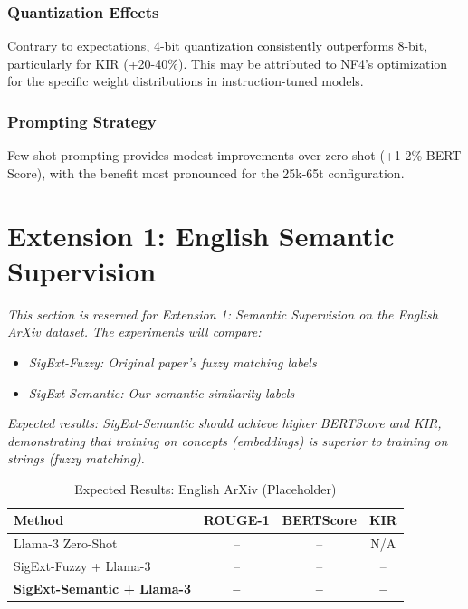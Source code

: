 \documentclass[conference]{IEEEtran}
\begin{document}
\subsubsection{Quantization Effects}
Contrary to expectations, 4-bit quantization consistently outperforms 8-bit, particularly for KIR (+20-40\%). This may be attributed to NF4's optimization for the specific weight distributions in instruction-tuned models.

\subsubsection{Prompting Strategy}
Few-shot prompting provides modest improvements over zero-shot (+1-2\% BERT Score), with the benefit most pronounced for the 25k-65t configuration.

\section{Extension 1: English Semantic Supervision}

\textit{This section is reserved for Extension 1: Semantic Supervision on the English ArXiv dataset. The experiments will compare:}

\begin{itemize}
    \item \textit{SigExt-Fuzzy: Original paper's fuzzy matching labels}
    \item \textit{SigExt-Semantic: Our semantic similarity labels}
\end{itemize}

\textit{Expected results: SigExt-Semantic should achieve higher BERTScore and KIR, demonstrating that training on concepts (embeddings) is superior to training on strings (fuzzy matching).}

\begin{table}[htbp]
\caption{Expected Results: English ArXiv (Placeholder)}
\begin{center}
\begin{tabular}{lccc}
\toprule
\textbf{Method} & \textbf{ROUGE-1} & \textbf{BERTScore} & \textbf{KIR} \\
\midrule
Llama-3 Zero-Shot & -- & -- & N/A \\
SigExt-Fuzzy + Llama-3 & -- & -- & -- \\
\textbf{SigExt-Semantic + Llama-3} & \textbf{--} & \textbf{--} & \textbf{--} \\
\bottomrule
\end{tabular}
\label{tab:arxiv_placeholder}
\end{center}
\end{table}
\end{document}
